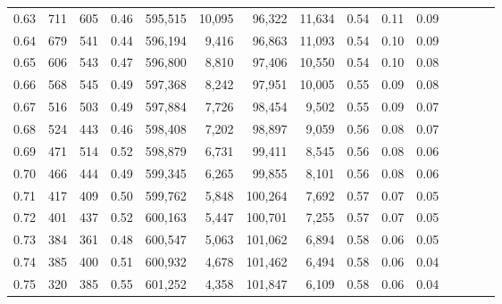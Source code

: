 \begin{tabular}{rrrcrrrrrrrrrrr}
0.63 &     711 &    605 &                                       0.46 &  595,515 &   10,095 &   96,322 &   11,634 &  0.54 &  0.11 &                         0.09 \\
0.64 &     679 &    541 &                                       0.44 &  596,194 &    9,416 &   96,863 &   11,093 &  0.54 &  0.10 &                         0.09 \\
0.65 &     606 &    543 &                                       0.47 &  596,800 &    8,810 &   97,406 &   10,550 &  0.54 &  0.10 &                         0.08 \\
0.66 &     568 &    545 &                                       0.49 &  597,368 &    8,242 &   97,951 &   10,005 &  0.55 &  0.09 &                         0.08 \\
0.67 &     516 &    503 &                                       0.49 &  597,884 &    7,726 &   98,454 &    9,502 &  0.55 &  0.09 &                         0.07 \\
0.68 &     524 &    443 &                                       0.46 &  598,408 &    7,202 &   98,897 &    9,059 &  0.56 &  0.08 &                         0.07 \\
0.69 &     471 &    514 &                                       0.52 &  598,879 &    6,731 &   99,411 &    8,545 &  0.56 &  0.08 &                         0.06 \\
0.70 &     466 &    444 &                                       0.49 &  599,345 &    6,265 &   99,855 &    8,101 &  0.56 &  0.08 &                         0.06 \\
0.71 &     417 &    409 &                                       0.50 &  599,762 &    5,848 &  100,264 &    7,692 &  0.57 &  0.07 &                         0.05 \\
0.72 &     401 &    437 &                                       0.52 &  600,163 &    5,447 &  100,701 &    7,255 &  0.57 &  0.07 &                         0.05 \\
0.73 &     384 &    361 &                                       0.48 &  600,547 &    5,063 &  101,062 &    6,894 &  0.58 &  0.06 &                         0.05 \\
0.74 &     385 &    400 &                                       0.51 &  600,932 &    4,678 &  101,462 &    6,494 &  0.58 &  0.06 &                         0.04 \\
0.75 &     320 &    385 &                                       0.55 &  601,252 &    4,358 &  101,847 &    6,109 &  0.58 &  0.06 &                         0.04 \\

\end{tabular}

